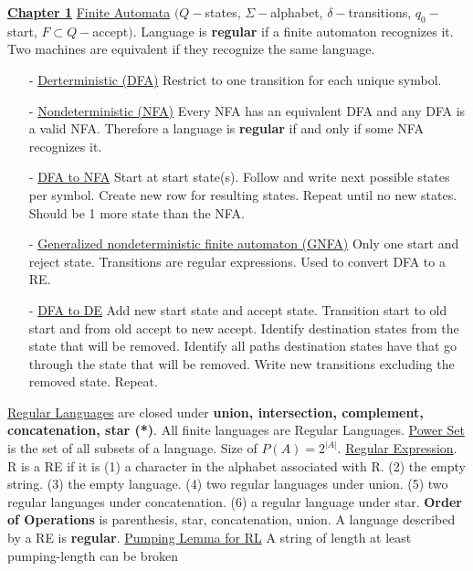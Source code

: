 \documentclass[9pt]{article}
\begin{document}
\graphicspath{ {final_img/} }
\setlength{\multicolsep}{2pt}
\noindent\uline{\textbf{Chapter 1}}\newline
\uline{Finite Automata} $(Q - $states, $\Sigma - $alphabet, $ \delta - $transitions,
$q_0 - $start, $F\subset Q - $accept$)$. Language is \textbf{regular} if a finite 
automaton recognizes it. Two machines are equivalent if they recognize the same
language.
\begin{itemize}[noitemsep, topsep=0pt]
    \item[-]\uline{Derterministic (DFA)} Restrict to one transition for each unique 
    symbol.
    \item[-]\uline{Nondeterministic (NFA)} Every NFA has an equivalent DFA and any 
    DFA is a valid NFA. Therefore a language is \textbf{regular} if and only if some 
    NFA recognizes it. 
    \item[-]\uline{DFA to NFA} Start at start state(s). Follow and write next possible 
    states per symbol. Create new row for resulting states. Repeat until no new states.
    Should be 1 more state than the NFA.
    \item[-]\uline{Generalized nondeterministic finite automaton (GNFA)} Only one start
    and reject state. Transitions are regular expressions. Used to convert DFA to a RE.
    \item[-]\uline{DFA to DE} Add new start state and accept state. Transition start 
    to old start and from old accept to new accept. Identify destination states from 
    the state that will be removed. Identify all paths destination states have that go
    through the state that will be removed. Write new transitions excluding the removed
    state. Repeat.
\end{itemize}
\uline{Regular Languages} are closed under \textbf{union, intersection, complement, 
concatenation, star (*)}. All finite languages are Regular Languages. \newline
\uline{Power Set} is the set of all subsets of a language. Size of $P(A) = 2^{|A|}$. 
\newline
\uline{Regular Expression}. R is a RE if it is (1) a character in the alphabet 
associated with R. (2) the empty string. (3) the empty language. (4) two regular 
languages under union. (5) two regular languages under concatenation. (6) a regular 
language under star. \textbf{Order of Operations} is parenthesis, star, concatenation,
union. A language described by a RE is \textbf{regular}.\newline
\uline{Pumping Lemma for RL} A string of length at least pumping-length can be broken
\end{document}
